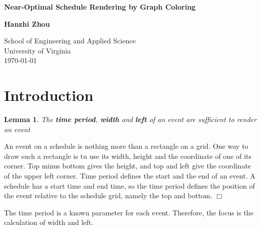 \documentclass[12pt]{article}
\newtheorem{lemma}{Lemma}
\newenvironment{proof}{\par\noindent{\it Proof.}\hspace*{1em}}{$\Box$\bigskip}
\begin{document}
\begin{titlepage}
    \begin{center}
        \vspace*{1cm}
 
        \LARGE\textbf{Near-Optimal Schedule Rendering by Graph Coloring}
   
        \vspace{1.5cm}
 
        \textbf{Hanzhi Zhou}
 
        \vfill
        \vspace{0.8cm}

        \Large
        School of Engineering and Applied Science\\
        \vspace{0.2cm}
        University of Virginia\\
        \vspace{0.2cm}
        \today
        \vspace{1cm}
    \end{center}
    \clearpage
\end{titlepage}

\section{Introduction}

\begin{lemma}
    The \textbf{time period}, \textbf{width} and \textbf{left} of an event are sufficient to render an event
\end{lemma}
\begin{proof}
    An event on a schedule is nothing more than a rectangle on a grid. One way to draw such a rectangle is tu use its width, height and the coordinate of one of its corner. Top minus bottom gives the height, and top and left give the coordinate of the upper left corner. Time period defines the start and the end of an event. A schedule has a start time and end time, so the time period defines the position of the event relative to the schedule grid, namely the top and bottom. 
\end{proof}

The time period is a known parameter for each event. Therefore, the focus is the calculation of width and left.
\end{document}
